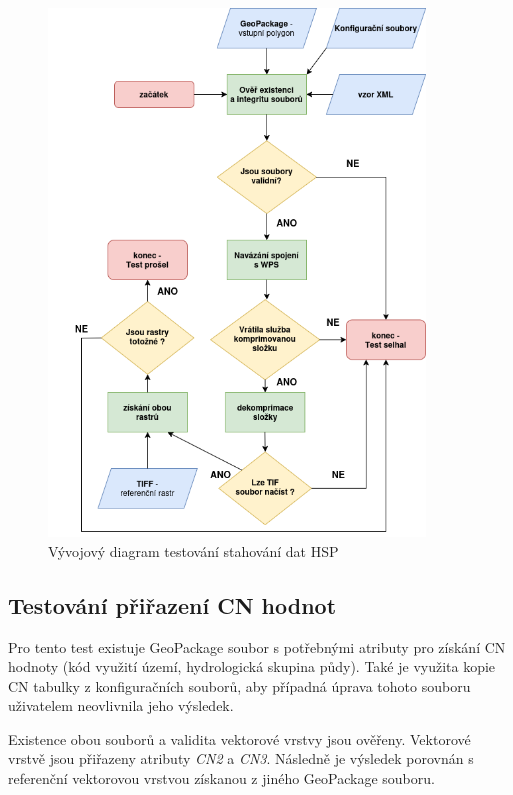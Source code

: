 \documentclass[a4paper,oneside,12pt]{book}
\begin{document}
\begin{figure}[H] \label{obr20}
\centering
\includegraphics[height=14cm]{pictures/test3.png}
\caption{Vývojový diagram testování stahování dat HSP}
\label{fig:test3}
\end{figure}

\subsection{Testování přiřazení CN hodnot} \label{test_CN}

\hspace{10mm} Pro tento test existuje GeoPackage soubor s potřebnými atributy pro získání CN hodnoty (kód využití území, hydrologická skupina půdy). Také je využita kopie CN tabulky z konfiguračních souborů, aby případná úprava tohoto souboru uživatelem neovlivnila jeho výsledek.

\hspace{10mm} Existence obou souborů a validita vektorové vrstvy jsou ověřeny. Vektorové vrstvě jsou přiřazeny atributy \textit{CN2} a \textit{CN3}. Následně je výsledek porovnán s referenční vektorovou vrstvou získanou z jiného GeoPackage souboru.
\end{document}
